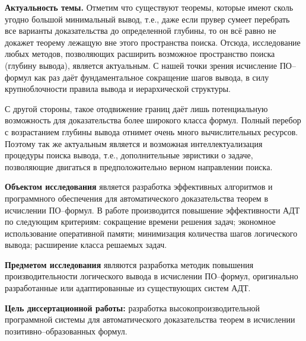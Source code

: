 \documentclass[a4paper]{report}
\begin{document}
\textbf{Актуальность темы.}
Отметим что существуют теоремы, которые имеют сколь угодно большой минимальный вывод, т.е., даже если прувер сумеет перебрать все варианты доказательства до определенной глубины, то он всё равно не докажет теорему лежащую вне этого пространства поиска. Отсюда, исследование любых методов, позволяющих расширить возможное пространство поиска (глубину вывода), является актуальным. С нашей точки зрения исчисление ПО--формул как раз даёт фундаментальное сокращение шагов вывода, в силу крупноблочности правила вывода и иерархической структуры.

С другой стороны, такое отодвижение границ даёт лишь потенциальную возможность для доказательства более широкого класса формул. Полный перебор с возрастанием глубины вывода отнимет очень много вычислительных ресурсов. Поэтому так же актуальным является и возможная интеллектуализация процедуры поиска вывода, т.е., дополнительные эвристики о задаче, позволяющие двигаться в предположительно верном направлении поиска.

\textbf{Объектом исследования} является разработка эффективных алгоритмов и программного обеспечения для автоматического доказательства теорем в исчислении ПО--формул. В работе производится повышение эффективности АДТ по следующим критериям: сокращение времени решения задач; экономное использование оперативной памяти; минимизация количества шагов логического вывода; расширение класса решаемых задач.

\textbf{Предметом исследования} являются разработка методик повышения производительности логического вывода в исчислении ПО--формул, оригинально разработанные или адаптированные из существующих систем АДТ.

\textbf{Цель диссертационной работы:} разработка высокопроизводительной программной системы для автоматического доказательства теорем в исчислении позитивно--образованных формул.
\end{document}
